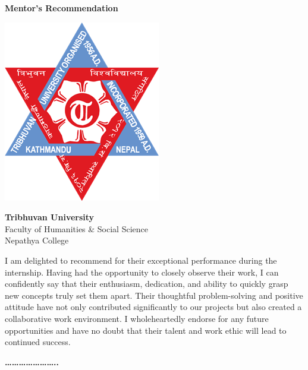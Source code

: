 
\centering
\begin{center}
    {\Large \textbf{Mentor's Recommendation}}
\end{center}

\vspace{1.5cm}
\includegraphics[scale=0.3]{contents/frontmatter/images/tu-logo.png} \\ 
\vspace{1.5cm}


\begin{center}
    {\Large \textbf{Tribhuvan University}} \\  
    {\large Faculty of Humanities \& Social Science} \\  
    {\large Nepathya College}  
\end{center}

\vspace{1cm}  %


\noindent 
I am delighted to recommend  for their exceptional performance during the internship. Having had the opportunity to closely observe their work, I can confidently say that their enthusiasm, dedication, and ability to quickly grasp new concepts truly set them apart. Their thoughtful problem-solving and positive attitude have not only contributed significantly to our projects but also created a collaborative work environment. I wholeheartedly endorse  for any future opportunities and have no doubt that their talent and work ethic will lead to continued success.
\vspace{2cm}  %

\begin{flushleft}
    \textbf{…………………..} \\  
    \textbf{  } \\  
    \textbf{ } \\  
\end{flushleft}

\newpage
